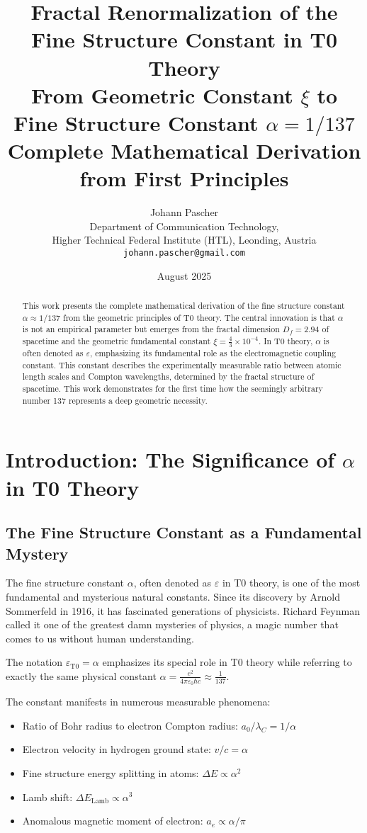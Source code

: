 \documentclass[12pt,a4paper]{article}
\title{\textbf{Fractal Renormalization of the Fine Structure Constant in T0 Theory}\\[0.5cm]
	\large From Geometric Constant $\xi$ to Fine Structure Constant $\alpha = 1/137$\\[0.3cm]
	\normalsize Complete Mathematical Derivation from First Principles}
\author{Johann Pascher\\
	\small Department of Communication Technology,\\
	\small Higher Technical Federal Institute (HTL), Leonding, Austria\\
	\small \texttt{johann.pascher@gmail.com}}
\date{August 2025}
\theoremstyle{definition}
\begin{document}
	
	\maketitle
	
	\begin{abstract}
		This work presents the complete mathematical derivation of the fine structure constant $\alpha \approx 1/137$ from the geometric principles of T0 theory. The central innovation is that $\alpha$ is not an empirical parameter but emerges from the fractal dimension $D_f = 2.94$ of spacetime and the geometric fundamental constant $\xi = \frac{4}{3} \times 10^{-4}$. In T0 theory, $\alpha$ is often denoted as $\varepsilon$, emphasizing its fundamental role as the electromagnetic coupling constant. This constant describes the experimentally measurable ratio between atomic length scales and Compton wavelengths, determined by the fractal structure of spacetime. This work demonstrates for the first time how the seemingly arbitrary number 137 represents a deep geometric necessity.
	\end{abstract}
	
	\tableofcontents
	\newpage
	
	\section{Introduction: The Significance of $\alpha$ in T0 Theory}
	
	\subsection{The Fine Structure Constant as a Fundamental Mystery}
	
	The fine structure constant $\alpha$, often denoted as $\varepsilon$ in T0 theory, is one of the most fundamental and mysterious natural constants. Since its discovery by Arnold Sommerfeld in 1916, it has fascinated generations of physicists. Richard Feynman called it one of the greatest damn mysteries of physics, a magic number that comes to us without human understanding.
	
	The notation $\varepsilon_{\mathrm{T0}} = \alpha$ emphasizes its special role in T0 theory while referring to exactly the same physical constant $\alpha = \frac{e^2}{4\pi\varepsilon_0\hbar c} \approx \frac{1}{137}$.
	
	The constant manifests in numerous measurable phenomena:
	\begin{itemize}
		\item Ratio of Bohr radius to electron Compton radius: $a_0/\lambda_C = 1/\alpha$
		\item Electron velocity in hydrogen ground state: $v/c = \alpha$
		\item Fine structure energy splitting in atoms: $\Delta E \propto \alpha^2$
		\item Lamb shift: $\Delta E_{\mathrm{Lamb}} \propto \alpha^3$
		\item Anomalous magnetic moment of electron: $a_e \propto \alpha/\pi$
	\end{itemize}
	
\end{document}
